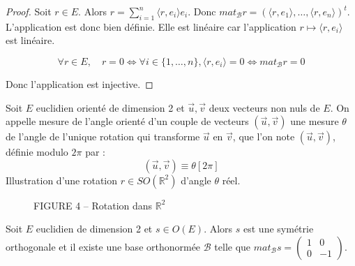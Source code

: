 \begin{proof}

Soit $r \in E$. Alors $r = \sum_{i=1}^n \langle r, e_i \rangle e_i$. Donc $mat_{\mathcal{B}} r = (\langle r, e_1 \rangle, \dots, \langle r, e_n \rangle)^t$. L'application est donc bien définie. Elle est linéaire car l'application $r \mapsto \langle r, e_i \rangle$ est linéaire.

\[
\forall r \in E, \quad r = 0 \Leftrightarrow \forall i \in \{1, \dots, n\}, \langle r, e_i \rangle = 0 \Leftrightarrow mat_{\mathcal{B}} r = 0
\]

Donc l'application est injective.


\end{proof}

\begin{definition}
\label{def:13}

Soit $E$ euclidien orienté de dimension 2 et $\vec{u}, \vec{v}$ deux vecteurs non nuls de $E$.
On appelle mesure de l'angle orienté d'un couple de vecteurs $(\vec{u}, \vec{v})$ une mesure $\theta$ de l'angle
de l'unique rotation qui transforme $\vec{u}$ en $\vec{v}$, que l'on note $(\vec{u}, \vec{v})$, définie modulo $2\pi$
par :
\[ (\vec{u}, \vec{v}) \equiv \theta [2\pi] \]
Illustration d'une rotation $r \in SO(\mathbb{R}^2)$ d'angle
$\theta$ réel.

\begin{figure}[H]
\centering
{}
\caption{FIGURE 4 – Rotation dans $\mathbb{R}^2$}
\end{figure}

\end{definition}

\begin{theorem}
\label{thm:8}

Soit $E$ euclidien de dimension 2 et $s \in O(E)$. Alors $s$ est une symétrie
orthogonale et il existe une base orthonormée $\mathcal{B}$ telle que $mat_{\mathcal{B}} s = \begin{pmatrix} 1 & 0 \\ 0 & -1 \end{pmatrix}$.

\end{theorem}

